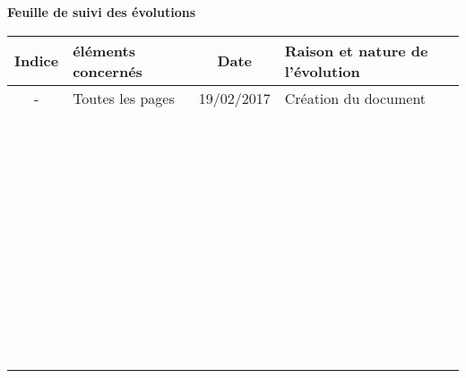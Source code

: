 \begin{center}\bfseries\Huge
    Feuille de suivi des évolutions
\end{center}
\begin{tabular}{|c|p{2.8cm}|c|p{9cm}|}
  \hline
  Indice & éléments concernés & Date & Raison et nature de l'évolution \\ \hline
  - & Toutes les pages & 19/02/2017 & Création du document\\
  &&&\\
  &&&\\
  &&&\\
  &&&\\
  &&&\\
  &&&\\
  &&&\\
  &&&\\
  &&&\\
  &&&\\
  &&&\\
  &&&\\
  &&&\\
  &&&\\
  &&&\\
  &&&\\
  &&&\\
  &&&\\
  &&&\\
  &&&\\
  &&&\\
  &&&\\
  &&&\\
  &&&\\
  &&&\\
  &&&\\
  &&&\\
  &&&\\
  &&&\\
  &&&\\
  &&&\\
  &&&\\
  &&&\\
  &&&\\
  &&&\\
  &&&\\
  &&&\\
  &&&\\
  &&&\\
  &&&\\
  &&&\\
  &&&\\
  &&&\\
  &&&\\
  &&&\\
  &&&\\
  &&&\\
  &&&\\ \hline
\end{tabular}
